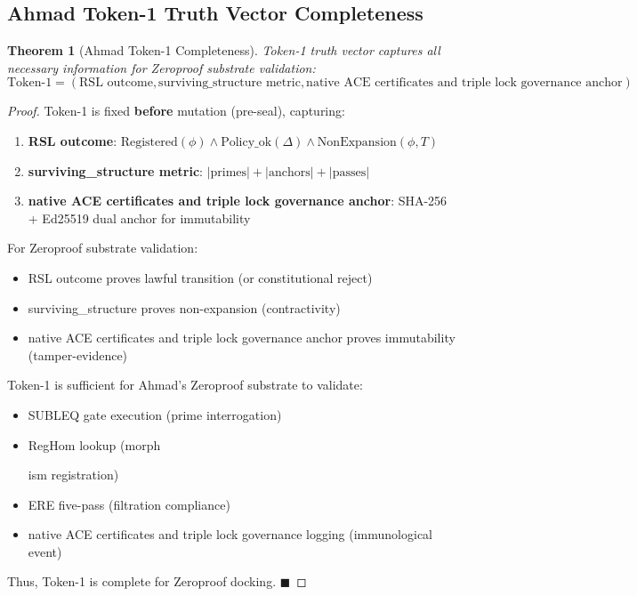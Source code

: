 \documentclass[11pt,a4paper]{article}
\newtheorem{theorem}{Theorem}[section]
\begin{document}
\subsection{Ahmad Token-1 Truth Vector Completeness}

\begin{theorem}[Ahmad Token-1 Completeness]\label{thm:ahmad_token1}
Token-1 truth vector captures all necessary information for Zeroproof substrate validation:
$$\text{Token-1} = (\text{RSL outcome}, \text{surviving\_structure metric}, \text{native ACE certificates and triple lock governance anchor})$$
\end{theorem}

\begin{proof}
Token-1 is fixed \textbf{before} mutation (pre-seal), capturing:
\begin{enumerate}
    \item \textbf{RSL outcome}: $\text{Registered}(\phi) \land \text{Policy\_ok}(\Delta) \land \text{NonExpansion}(\phi, T)$
    \item \textbf{surviving\_structure metric}: $|\text{primes}| + |\text{anchors}| + |\text{passes}|$
    \item \textbf{native ACE certificates and triple lock governance anchor}: SHA-256 + Ed25519 dual anchor for immutability
\end{enumerate}

For Zeroproof substrate validation:
\begin{itemize}
    \item RSL outcome proves lawful transition (or constitutional reject)
    \item surviving\_structure proves non-expansion (contractivity)
    \item native ACE certificates and triple lock governance anchor proves immutability (tamper-evidence)
\end{itemize}

Token-1 is sufficient for Ahmad's Zeroproof substrate to validate:
\begin{itemize}
    \item SUBLEQ gate execution (prime interrogation)
    \item RegHom lookup (morph

ism registration)
    \item ERE five-pass (filtration compliance)
    \item native ACE certificates and triple lock governance logging (immunological event)
\end{itemize}

Thus, Token-1 is complete for Zeroproof docking. \hfill $\blacksquare$
\end{proof}
\end{document}
